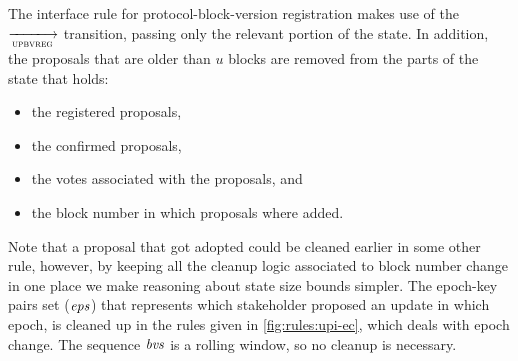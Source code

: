 \clearpage

The interface rule for protocol-block-version registration makes use of the
$\trans{upbvreg}{}$ transition, passing only the relevant portion of the state.
In addition, the proposals that are older than $u$ blocks are removed from the
parts of the state that holds:
\begin{itemize}
\item the registered proposals,
\item the confirmed proposals,
\item the votes associated with the proposals, and
\item the block number in which proposals where added.
\end{itemize}
Note that a proposal that got adopted could be cleaned earlier in some other
rule, however, by keeping all the cleanup logic associated to block number
change in one place we make reasoning about state size bounds simpler. The
epoch-key pairs set ($\mathit{eps}$) that represents which stakeholder proposed an
update in which epoch, is cleaned up in the rules given in
\cref{fig:rules:upi-ec}, which deals with epoch change. The sequence
$\mathit{bvs}$ is a rolling window, so no cleanup is necessary.

